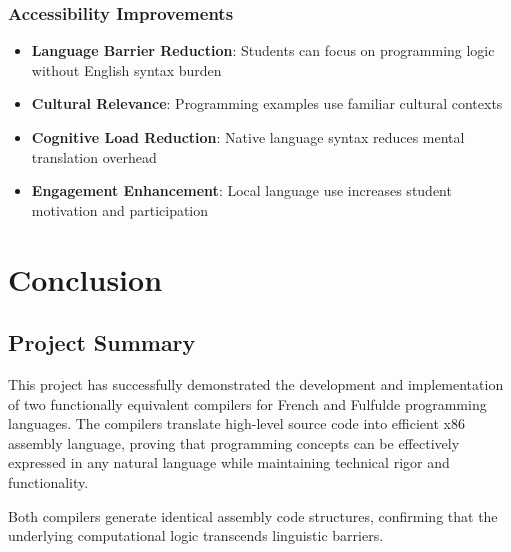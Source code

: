 \documentclass[12pt,a4paper]{article}
\begin{document}
\subsubsection{Accessibility Improvements}

\begin{itemize}
    \item \textbf{Language Barrier Reduction}: Students can focus on programming logic without English syntax burden
    \item \textbf{Cultural Relevance}: Programming examples use familiar cultural contexts
    \item \textbf{Cognitive Load Reduction}: Native language syntax reduces mental translation overhead
    \item \textbf{Engagement Enhancement}: Local language use increases student motivation and participation
\end{itemize}

\section{Conclusion}

\subsection{Project Summary}

This project has successfully demonstrated the development and implementation of two functionally equivalent compilers for French and Fulfulde programming languages. The compilers translate high-level source code into efficient x86 assembly language, proving that programming concepts can be effectively expressed in any natural language while maintaining technical rigor and functionality.

Both compilers generate identical assembly code structures, confirming that the underlying computational logic transcends linguistic barriers.
\end{document}

